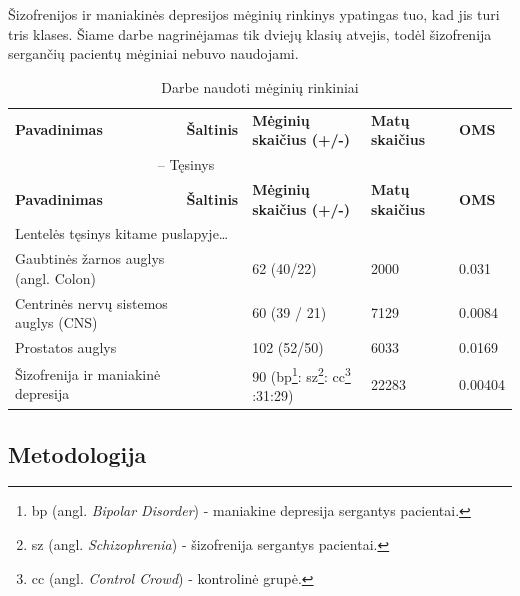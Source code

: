 Šizofrenijos ir maniakinės depresijos mėginių rinkinys ypatingas tuo, kad jis turi tris klases. Šiame darbe nagrinėjamas tik dviejų klasių atvejis, todėl šizofrenija sergančių pacientų mėginiai nebuvo naudojami.
\begin{longtable}{|p{4.5cm}|p{2cm}|p{3.9cm}|p{2.1cm}|p{1.8cm}|}
\captionsetup{labelsep=period}
\caption{Darbe naudoti mėginių rinkiniai\label{table:datasets}}\\
\hline \hline
{\textbf{Pavadinimas}} &
{\textbf{Šaltinis}} &
{\textbf{Mėginių skaičius (+/-)}} &
{\textbf{Matų \newline skaičius}} &
{\textbf{OMS}}\\
\hline
\endfirsthead
\multicolumn{3}{c}{{\tablename} \thetable{} -- Tęsinys} \\[0.5ex]
\hline \hline
{\textbf{Pavadinimas}} &
{\textbf{Šaltinis}} &
{\textbf{Mėginių skaičius (+/-)}}&
{\textbf{Matų \newline skaičius}} &
{\textbf{OMS}}\\
\hline
\endhead
\multicolumn{3}{l}{{Lentelės tęsinys kitame puslapyje\ldots}} \\
\endfoot
\hline \hline
\endlastfoot
\hline 
Gaubtinės žarnos auglys (angl. Colon) 
& 
\cite{alon1999broad} 
& 
62 (40/22) 
& 
2000 
& 
0.031 \\
\hline
Centrinės nervų sistemos auglys (CNS) 
& 
\cite{pomeroy2002prediction} 
& 
60 (39 / 21) 
& 
7129 
& 
0.0084 \\
\hline
Prostatos auglys 
& 
\cite{singh2002gene} 
& 
102 (52/50) 
& 
6033 
& 
0.0169 \\
\hline
Šizofrenija ir maniakinė depresija
&
\cite{altara}
&
90 (bp\footnote{bp (angl. \textit{Bipolar Disorder}) - maniakine depresija sergantys pacientai.}:
sz\footnote{sz (angl. \textit{Schizophrenia}) - šizofrenija sergantys pacientai.}:
cc\footnote{cc (angl. \textit{Control Crowd}) - kontrolinė grupė.} \newline =30:31:29)
&
22283
&
0.00404 \\
\hline
\end{longtable}

\subsection{Metodologija}

